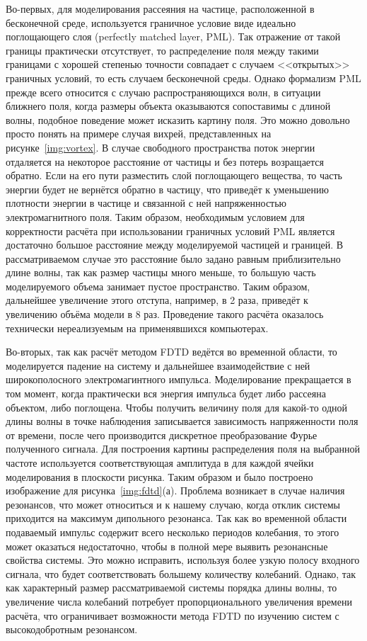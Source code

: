 Во-первых, для моделирования рассеяния на частице, расположенной в
бесконечной среде, используется граничное условие виде идеально
поглощающего слоя (perfectly matched layer, PML). Так отражение от
такой границы практически отсутствует, то распределение поля между
такими границами с хорошей степенью точности совпадает с случаем
<<открытых>> граничных условий, то есть случаем бесконечной среды.
Однако формализм PML прежде всего относится с случаю
распространяющихся волн, в ситуации ближнего поля, когда размеры
объекта оказываются сопоставимы с длиной волны, подобное поведение
может исказить картину поля. Это можно довольно просто понять на
примере случая вихрей, представленных на рисунке~\ref{img:vortex}.  В
случае свободного пространства поток энергии отдаляется на некоторое
расстояние от частицы и без потерь возращается обратно. Если на его
пути разместить слой поглощающего вещества, то часть энергии будет не
вернётся обратно в частицу, что приведёт к уменьшению плотности
энергии в частице и связанной с ней напряженностью электромагнитного
поля.  Таким образом, необходимым условием для корректности расчёта
при использовании граничных условий PML является достаточно большое
расстояние между моделируемой частицей и границей. В рассматриваемом
случае это расстояние было задано равным приблизительно длине волны,
так как размер частицы много меньше, то большую часть моделируемого
объема занимает пустое пространство. Таким образом, дальнейшее
увеличение этого отступа, например, в 2 раза, приведёт к увеличению
объёма модели в 8 раз. Проведение такого расчёта оказалось технически
нереализуемым на применявшихся компьютерах.

Во-вторых, так как расчёт методом FDTD ведётся во временной области,
то моделируется падение на систему и дальнейшее взаимодействие с ней
широкополосного электромагинтного импульса.  Моделирование
прекращается в том момент, когда практически вся энергия импульса
будет либо рассеяна объектом, либо поглощена.  Чтобы получить величину
поля для какой-то одной длины волны в точке наблюдения записывается
зависимость напряженности поля от времени, после чего производится
дискретное преобразование Фурье полученного сигнала. Для построения
картины распределения поля на выбранной частоте используется
соответствующая амплитуда в для каждой ячейки моделирования в
плоскости рисунка. Таким образом и было построено изображение для
рисунка~\ref{img:fdtd}(а). Проблема возникает в случае наличия
резонансов, что может относиться и к нашему случаю, когда отклик
системы приходится на максимум дипольного резонанса. Так как во
временной области подаваемый импульс содержит всего несколько периодов
колебания, то этого может оказаться недостаточно, чтобы в полной мере
выявить резонансные свойства системы.  Это можно исправить, используя
более узкую полосу входного сигнала, что будет соответствовать
большему количеству колебаний. Однако, так как характерный размер
рассматриваемой системы порядка длины волны, то увеличение числа
колебаний потребует пропорционального увеличения времени расчёта, что
ограничивает возможности метода FDTD по изучению систем с
высокодобротным резонансом.

